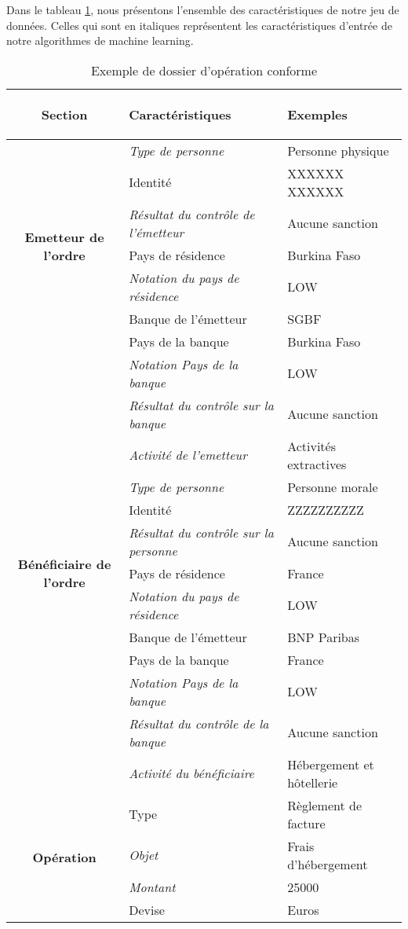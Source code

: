 Dans le tableau \ref{tab:tab3}, nous présentons l'ensemble des caractéristiques de
notre jeu de données. Celles qui sont en italiques représentent les 
caractéristiques d'entrée de notre algorithmes de machine learning.


\begin{table}

  \begin{center}
    \begin{scriptsize}
      \renewcommand{\arraystretch}{2}
      \begin{tabular}{|c|l|l|}
        \hline
        \rowcolor[gray]{.7}
        \bf \rule[-0.4cm]{0mm}{1cm} Section & \bf Caractéristiques & \bf Exemples\\
        \hline
        \multirow{7}{*}{\bf Emetteur de l'ordre} & \textit{Type de personne} & Personne 
        physique 
        \tabularnewline
        & Identité & XXXXXX XXXXXX \tabularnewline 
        & \textit{Résultat du contrôle de l'émetteur} & Aucune sanction  \tabularnewline
        & Pays de résidence & Burkina Faso \tabularnewline
        & \textit{Notation du pays de résidence} & LOW \tabularnewline
        & Banque de l’émetteur & SGBF \tabularnewline
        & Pays de la banque & Burkina Faso \tabularnewline
        & \textit{Notation Pays de la banque} & LOW \tabularnewline
        & \textit{Résultat du contrôle sur la banque} & Aucune sanction  \tabularnewline
        & \textit{Activité de l'emetteur} & Activités extractives \tabularnewline 
        \hline

        \multirow{7}{*}{\bf Bénéficiaire de l'ordre} & \textit{Type de personne} & Personne
        morale 
        \tabularnewline
        & Identité & ZZZZZZZZZZ \tabularnewline
        & \textit{Résultat du contrôle sur la personne} & Aucune sanction  \tabularnewline
        & Pays de résidence & France \tabularnewline 
        & \textit{Notation du pays de résidence} & LOW \tabularnewline
        & Banque de l’émetteur & BNP Paribas \tabularnewline
        & Pays de la banque & France \tabularnewline 
        & \textit{Notation Pays de la banque} & LOW \tabularnewline
        & \textit{Résultat du contrôle de la banque} & Aucune sanction  \tabularnewline
        & \textit{Activité du bénéficiaire} & Hébergement et hôtellerie  \tabularnewline 
        \hline
        \multirow{5}{*}{\bf Opération} & Type  & Règlement de facture \tabularnewline
        & \textit{Objet}  & Frais d'hébergement \tabularnewline
        & \textit{Montant}& 25000 \tabularnewline
        & Devise & Euros \tabularnewline

        \hline
      \end{tabular}
    \end{scriptsize}
    \caption{Exemple de dossier d'opération conforme \label{tab:tab3}}
  \end{center}
\end{table}


